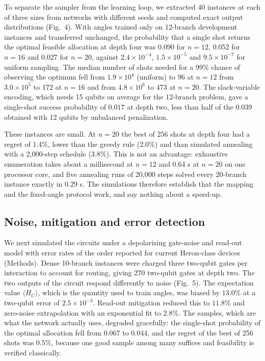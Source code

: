 \documentclass[12pt,a4paper]{article}
\begin{document}
To separate the sampler from the learning loop, we extracted 40 instances at each of three sizes from networks with different seeds and computed exact output distributions (Fig.~4). With angles trained only on 12-branch development instances and transferred unchanged, the probability that a single shot returns the optimal feasible allocation at depth four was $0.090$ for $n=12$, $0.052$ for $n=16$ and $0.027$ for $n=20$, against $2.4\times10^{-4}$, $1.5\times10^{-5}$ and $9.5\times10^{-7}$ for uniform sampling. The median number of shots needed for a 99\% chance of observing the optimum fell from $1.9\times10^{4}$ (uniform) to 96 at $n=12$ from $3.0\times10^{5}$ to 172 at $n=16$ and from $4.8\times10^{6}$ to 473 at $n=20$. The slack-variable encoding, which needs 15 qubits on average for the 12-branch problem, gave a single-shot success probability of $0.017$ at depth two, less than half of the $0.039$ obtained with 12 qubits by unbalanced penalization.

These instances are small. At $n=20$ the best of 256 shots at depth four had a regret of 1.4\%, lower than the greedy rule (2.0\%) and than simulated annealing with a 2,000-step schedule (3.8\%). This is not an advantage: exhaustive enumeration takes about a millisecond at $n=12$ and 0.64 s at $n=20$ on one processor core, and five annealing runs of 20,000 steps solved every 20-branch instance exactly in 0.29 s. The simulations therefore establish that the mapping and the fixed-angle protocol work, and say nothing about a speed-up.

\subsection*{Noise, mitigation and error detection}

We next simulated the circuits under a depolarizing gate-noise and read-out model with error rates of the order reported for current Heron-class devices\cite{ibm2026} (Methods). Dense 10-branch instances were charged three two-qubit gates per interaction to account for routing, giving 270 two-qubit gates at depth two. The two outputs of the circuit respond differently to noise (Fig.~5). The expectation value $\langle H_{C}\rangle$, which is the quantity used to train angles, was biased by $13.0$\% at a two-qubit error of $2.5\times10^{-3}$. Read-out mitigation\cite{vandenberg2022} reduced this to $11.8$\% and zero-noise extrapolation\cite{temme2017,li2017} with an exponential fit to $2.8$\%. The samples, which are what the network actually uses, degraded gracefully: the single-shot probability of the optimal allocation fell from $0.067$ to $0.044$, and the regret of the best of 256 shots was $0.5$\%, because one good sample among many suffices and feasibility is verified classically.
\end{document}
